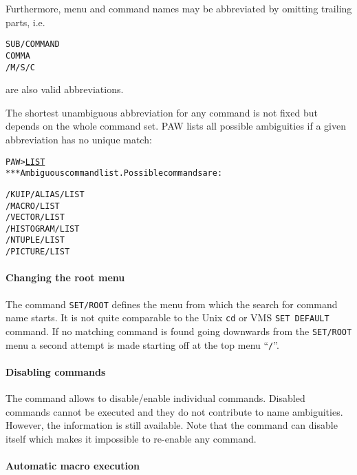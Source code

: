 Furthermore, menu and command names may be abbreviated by omitting
trailing parts, i.e.\
\begin{alltt}
SUB/COMMAND
COMMA
/M/S/C
\end{alltt}
are also valid abbreviations.

The shortest unambiguous abbreviation for any command is not fixed
but depends on the whole command set.
PAW lists all possible ambiguities if a given abbreviation has no
unique match:

\begin{alltt}
PAW > \underline{LIST}
 *** Ambiguous command list. Possible commands are :

 /KUIP/ALIAS/LIST
 /MACRO/LIST
 /VECTOR/LIST
 /HISTOGRAM/LIST
 /NTUPLE/LIST
 /PICTURE/LIST
\end{alltt}

\paragraph{Changing the root menu}

The command \texttt{SET/ROOT} defines the menu from which the search for
command name starts. 
It is not quite comparable to the Unix \texttt{cd} or VMS 
\texttt{SET DEFAULT} command.
If no matching command is found going downwards from the
\texttt{SET/ROOT} menu a second attempt is made starting off at the top
menu ``\texttt{/}''.

\paragraph{Disabling commands}

The command  allows to disable/enable individual commands.
\index{command!visibility}
Disabled commands cannot be executed and they do not contribute to
name ambiguities.
However, the  information is still available.
Note that the  command can disable itself which makes
it impossible to re-enable any command.


\paragraph{Automatic macro execution}

